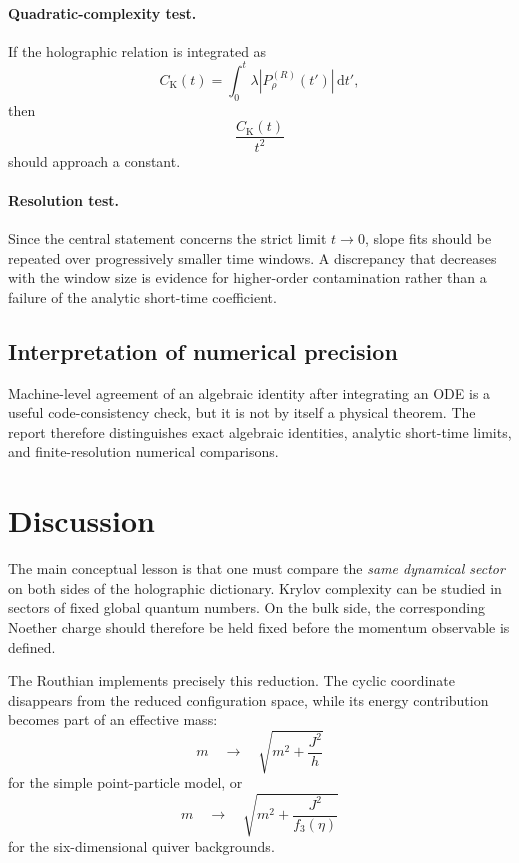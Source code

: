 \documentclass[11pt,a4paper]{article}
\theoremstyle{plain}
\theoremstyle{definition}
\theoremstyle{remark}
\newcommand{\PrhoR}{P_\rho^{(R)}}
\newcommand{\Ck}{C_{\mathrm K}}
\begin{document}
\paragraph{Quadratic-complexity test.}
If the holographic relation is integrated as
\begin{equation*}
\Ck(t)
=
\int_0^t
\lambda|\PrhoR(t')|\,\mathrm d t',
\end{equation*}
then
\begin{equation*}
\frac{\Ck(t)}{t^2}
\end{equation*}
should approach a constant.

\paragraph{Resolution test.}
Since the central statement concerns the strict limit $t\to0$, slope fits should be repeated over progressively smaller time windows. A discrepancy that decreases with the window size is evidence for higher-order contamination rather than a failure of the analytic short-time coefficient.

\subsection{Interpretation of numerical precision}

Machine-level agreement of an algebraic identity after integrating an ODE is a useful code-consistency check, but it is not by itself a physical theorem. The report therefore distinguishes exact algebraic identities, analytic short-time limits, and finite-resolution numerical comparisons.

\section{Discussion}
\label{sec:discussion}

The main conceptual lesson is that one must compare the \emph{same dynamical sector} on both sides of the holographic dictionary. Krylov complexity can be studied in sectors of fixed global quantum numbers. On the bulk side, the corresponding Noether charge should therefore be held fixed before the momentum observable is defined.

The Routhian implements precisely this reduction. The cyclic coordinate disappears from the reduced configuration space, while its energy contribution becomes part of an effective mass:
\begin{equation*}
m
\quad\longrightarrow\quad
\sqrt{m^2+\frac{J^2}{h}}
\end{equation*}
for the simple point-particle model, or
\begin{equation*}
m
\quad\longrightarrow\quad
\sqrt{m^2+\frac{J^2}{f_3(\eta)}}
\end{equation*}
for the six-dimensional quiver backgrounds.
\end{document}
